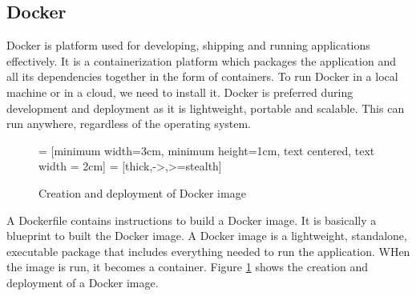 \subsection{Docker}
Docker is platform used for developing, shipping and running applications effectively. It is a containerization platform which packages the application and 
all its dependencies together in the form of containers. To run Docker in a local machine or in a cloud, we need to install it. Docker is preferred during
development and deployment as it is lightweight, portable and scalable. This can run anywhere, regardless of the operating system.
\begin{figure}[!ht]
  \centering
   = [minimum width=3cm, minimum height=1cm, text centered, text width = 2cm]
   = [thick,->,>=stealth]
  \caption{Creation and deployment of Docker image}
  \label{docker_image_creation}
\end{figure}
A Dockerfile contains instructions to build a Docker image. It is basically a blueprint to built the Docker image. A Docker image is a lightweight, standalone, 
executable package that includes everything needed to run the application. WHen the image is run, it becomes a container. Figure \ref{docker_image_creation}
shows the creation and deployment of a Docker image. 


